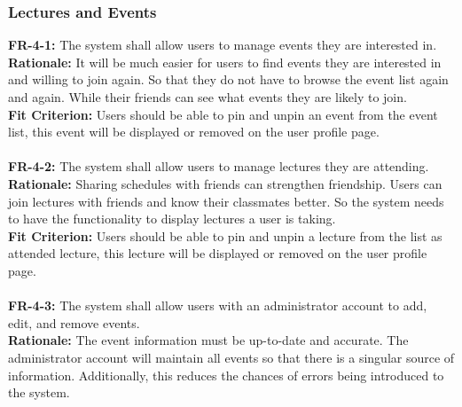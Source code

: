 \documentclass[12pt]{article}
\begin{document}
\subsubsection{Lectures and Events}
    \textbf{FR-4-1:} The system shall allow users to manage events they are interested in.\\
    \textbf{Rationale:} It will be much easier for users to find events they are interested in and willing to join again. So that they do not have to browse the event list again and again. While their friends can see what events they are likely to join.\\
    \textbf{Fit Criterion:} Users should be able to pin and unpin an event from the event list, this event will be displayed or removed on the user profile page.\\\\
    \textbf{FR-4-2:} The system shall allow users to manage lectures they are attending.\\
    \textbf{Rationale:} Sharing schedules with friends can strengthen friendship. Users can join lectures with friends and know their classmates better. So the system needs to have the functionality to display lectures a user is taking.\\
    \textbf{Fit Criterion:} Users should be able to pin and unpin a lecture from the list as attended lecture, this lecture will be displayed or removed on the user profile page.\\\\
    \textbf{FR-4-3:} The system shall allow users with an administrator account to add, edit, and remove events.\\
    \textbf{Rationale:} The event information must be up-to-date and accurate. The administrator account will maintain all events so that there is a singular source of information. Additionally, this reduces the chances of errors being introduced to the system.\\
\end{document}
